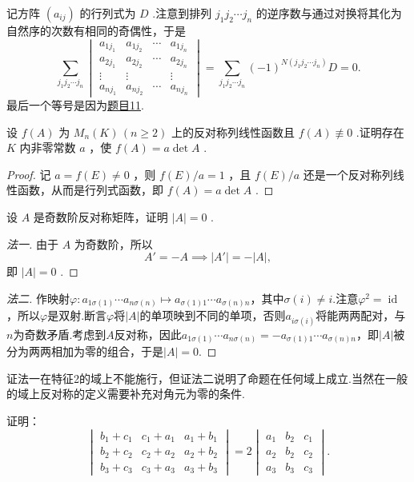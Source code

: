 \begin{sol}
	记方阵 $(a_{ij})$ 的行列式为 $D$ .注意到排列 $j_1j_2\cdots j_n$ 的逆序数与通过对换将其化为自然序的次数有相同的奇偶性，于是
	\[
		\sum_{j_1j_2\cdots j_n}
		\begin{vmatrix}
			a_{1j_1} & a_{1j_2} & \cdots & a_{1j_n} \\
			a_{2j_1} & a_{2j_2} & \cdots & a_{2j_n} \\
			\vdots   & \vdots   &        & \vdots   \\
			a_{nj_1} & a_{nj_2} & \cdots & a_{nj_n}
		\end{vmatrix}
		=\sum_{j_1j_2\cdots j_n}(-1)^{N(j_1j_2\cdots j_n)}D=0.
	\]
	最后一个等号是因为\hyperlink{Permutation}{题目11}.
\end{sol}
\begin{prob}[13]
	设 $f(A)$ 为 $M_n(K)\,(n\ge 2)$ 上的反对称列线性函数且 $f(A)\not\equiv0$ .证明存在 $K$ 内非零常数 $a$ ，使 $f(A)=a\det A$ .
\end{prob}
\begin{proof}
	记 $a=f(E)\ne0$ ，则 $f(E)/a=1$ ，且 $f(E)/a$ 还是一个反对称列线性函数，从而是行列式函数，即 $f(A)=a\det A$ .
\end{proof}
\begin{prob}[14]
	设 $A$ 是奇数阶反对称矩阵，证明 $|A|=0$ .
\end{prob}
\begin{proof}[法一]
	由于 $A$ 为奇数阶，所以
	\[
		A'=-A\implies |A'|=-|A|,
	\]
	即 $|A|=0$ .
\end{proof}
\begin{proof}[法二]
	作映射$\varphi\colon a_{1\sigma(1)}\cdots a_{n\sigma(n)}\mapsto a_{\sigma(1)1}\cdots a_{\sigma(n)n}$，其中$\sigma(i)\ne i$.注意$\varphi^2=\operatorname*{id}$，所以$\varphi$是双射.断言$\varphi$将$|A|$的单项映到不同的单项，否则$a_{i\sigma(i)}$将能两两配对，与$n$为奇数矛盾.考虑到$A$反对称，因此$a_{1\sigma(1)}\cdots a_{n\sigma(n)}=-a_{\sigma(1)1}\cdots a_{\sigma(n)n}$，即$|A|$被分为两两相加为零的组合，于是$|A|=0$.
\end{proof}
\begin{note}
	证法一在特征2的域上不能施行，但证法二说明了命题在任何域\footnotemark 上成立.当然在一般的域上反对称的定义需要补充对角元为零的条件.
\end{note}
\begin{prob}[20]
	证明：
	\[
		\begin{vmatrix}
			b_1+c_1 & c_1+a_1 & a_1+b_1 \\
			b_2+c_2 & c_2+a_2 & a_2+b_2 \\
			b_3+c_3 & c_3+a_3 & a_3+b_3
		\end{vmatrix}=2
		\begin{vmatrix}
			a_1 & b_2 & c_1 \\
			a_2 & b_2 & c_2 \\
			a_3 & b_3 & c_3
		\end{vmatrix}.
	\]
\end{prob}
